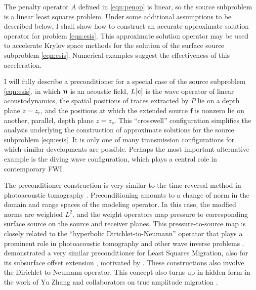 \documentclass[georeport,12pt]{geophysics}
\newcommand{\bff}{\mathbf{f}}
\newcommand{\bu}{\mathbf{u}}
\begin{document}
The penalty operator $A$ defined in \ref{eqn:penop} is linear, so the source
subproblem is a linear least squares problem. Under some additional
assumptions to be described below, I shall show how to construct an
accurate approximate solution operator for problem
\ref{eqn:esis}. This approximate solution operator may be used to
accelerate Krylov space methods for the solution of the surface source
subproblem \ref{eqn:esis}. Numerical examples suggest the
effectiveness of this acceleration.

I will fully describe a preconditioner for a special
case of the source subproblem \ref{eqn:esis}, in which ${\bf u}$ is an
acoustic field, $L[{\bf c}]$ is the wave operator of linear
acoustodynamics, the spatial positions of traces extracted by $P$ lie
on a depth plane $z=z_r$, and the positions at which the extended
source $\bff$ is nonzero lie on another, parallel, depth plane $z=z_s$. 
This
``crosswell'' configuration simplifies the analysis underlying the
construction of approximate solutions for the source subproblem
\ref{eqn:esis}. It is only one of many transmission configurations for
which similar developments are possible. Perhaps the most important
alternative example is the diving wave configuration, which plays a
central role in contemporary FWI. 

The preconditioner construction is very similar to the time-reversal
method in photoacoustic tomography
\cite[]{StefanovUhlmannIP:09}. Preconditioning amounts to a change of
norm in the domain and range spaces of the modeling operator. In this
case, the modfied norms are weighted $L^2$, and the weight operators
map pressure to corresponding surface source on the source and
receiver planes. This pressure-to-source map is closely related to the ``hyperbolic
Dirichlet-to-Neumann'' operator that plays a prominent role in
photoacoustic tomography and other wave inverse problems
\cite[]{Rachele:00,StefUhl:05}. \cite{HouSymes:EAGE16} demonstrated a
very similar preconditioner for Least Squares Migration, also for its
subsurface offset extension \cite[]{HouSymes:16}, motivated by
\cite{tenKroode:12}. These constructions also involve the
Dirichlet-to-Neumann operator. This concept also turns up in hidden
form in the work of Yu Zhang and collaborators on true amplitude
migration
\cite[]{YuZhang:14,TangXuZhang:13,XuWang:2012,XuZhangTang:11,Zhang:SEG09}.
\end{document}
